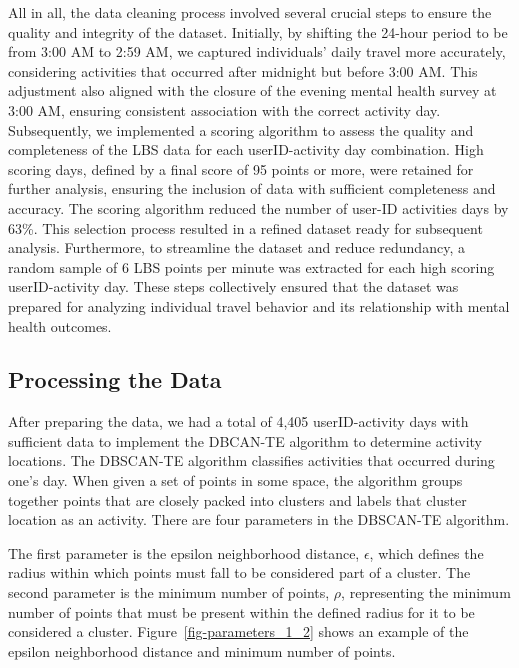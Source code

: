 \documentclass[
  letterpaper,
  number,
  review,
  3p]{elsarticle}
\begin{document}
All in all, the data cleaning process involved several crucial steps to
ensure the quality and integrity of the dataset. Initially, by shifting
the 24-hour period to be from 3:00 AM to 2:59 AM, we captured
individuals' daily travel more accurately, considering activities that
occurred after midnight but before 3:00 AM. This adjustment also aligned
with the closure of the evening mental health survey at 3:00 AM,
ensuring consistent association with the correct activity day.
Subsequently, we implemented a scoring algorithm to assess the quality
and completeness of the LBS data for each userID-activity day
combination. High scoring days, defined by a final score of 95 points or
more, were retained for further analysis, ensuring the inclusion of data
with sufficient completeness and accuracy. The scoring algorithm reduced
the number of user-ID activities days by 63\%. This selection process
resulted in a refined dataset ready for subsequent analysis.
Furthermore, to streamline the dataset and reduce redundancy, a random
sample of 6 LBS points per minute was extracted for each high scoring
userID-activity day. These steps collectively ensured that the dataset
was prepared for analyzing individual travel behavior and its
relationship with mental health outcomes.

\subsection{Processing the Data}\label{processing-the-data}

After preparing the data, we had a total of 4,405 userID-activity days
with sufficient data to implement the DBCAN-TE algorithm to determine
activity locations. The DBSCAN-TE algorithm classifies activities that
occurred during one's day. When given a set of points in some space, the
algorithm groups together points that are closely packed into clusters
and labels that cluster location as an activity. There are four
parameters in the DBSCAN-TE algorithm.

The first parameter is the epsilon neighborhood distance, \(\epsilon\),
which defines the radius within which points must fall to be considered
part of a cluster. The second parameter is the minimum number of points,
\(\rho\), representing the minimum number of points that must be present
within the defined radius for it to be considered a cluster.
Figure~\ref{fig-parameters_1_2} shows an example of the epsilon
neighborhood distance and minimum number of points.
\end{document}
